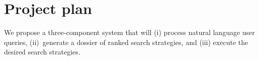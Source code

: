\documentclass[11pt,notitlepage]{article}
\begin{document}

\section{Project plan}
We propose a three-component system that will (i) process natural language user
queries, (ii)~generate a dossier of ranked search strategies, and (iii) execute
the desired search strategies.
\end{document}
